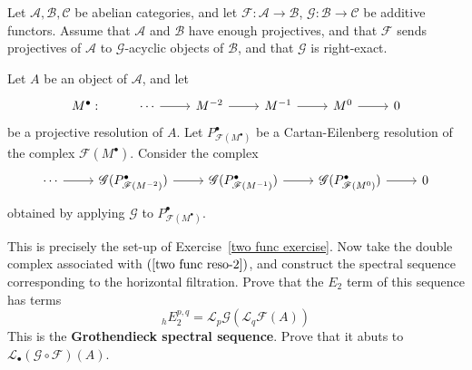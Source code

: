 \begin{exercise}
Let $\mathcal{A},\mathcal{B},\mathcal{C}$ be abelian categories, and let $\mathscr{F}:\mathcal{A}\to\mathcal{B}$, $\mathscr{G}:\mathcal{B}\to\mathcal{C}$ be additive 
functors. Assume that $\mathcal{A}$ and $\mathcal{B}$ have enough projectives, and that $\mathscr{F}$ sends projectives of $\mathcal{A}$ to $\mathscr{G}$-acyclic 
objects of $\mathcal{B}$, and that $\mathscr{G}$ is right-exact.\par
Let $A$ be an object of $\mathcal{A}$, and let 
\[\begin{tikzcd}
M^\bullet:&\cdots\ar[r]&M^{-2}\ar[r]&M^{-1}\ar[r]&M^0\ar[r]&0
\end{tikzcd}\]
be a projective resolution of $A$. Let $P^\bullet_{\mathscr{F}(M^\bullet)}$ be a Cartan-Eilenberg resolution of the complex $\mathscr{F}(M^\bullet)$. Consider the complex
\begin{equation}\label{two func reso-2}
\begin{tikzcd}
\cdots\ar[r]&\mathscr{G}(P^\bullet_{\mathscr{F}(M^{-2})})\ar[r]&\mathscr{G}(P^\bullet_{\mathscr{F}(M^{-1})})\ar[r]&\mathscr{G}(P^\bullet_{\mathscr{F}(M^{0})})\ar[r]&0
\end{tikzcd}
\end{equation}
obtained by applying $\mathscr{G}$ to $P^\bullet_{\mathscr{F}(M^\bullet)}$. \par
This is precisely the set-up of Exercise~\ref{two func exercise}. Now take the double complex associated with $(\ref{two func reso-2})$, and construct the spectral 
sequence corresponding to the horizontal filtration. Prove that the $E_2$ term of this sequence has terms
\[_{h}E^{p,q}_2=\mathcal{L}_p\mathscr{G}(\mathcal{L}_q\mathscr{F}(A))\]
This is the \textbf{Grothendieck spectral sequence}. Prove that it abuts to $\mathcal{L}_\bullet(\mathscr{G}\circ\mathscr{F})(A)$.
\end{exercise}
